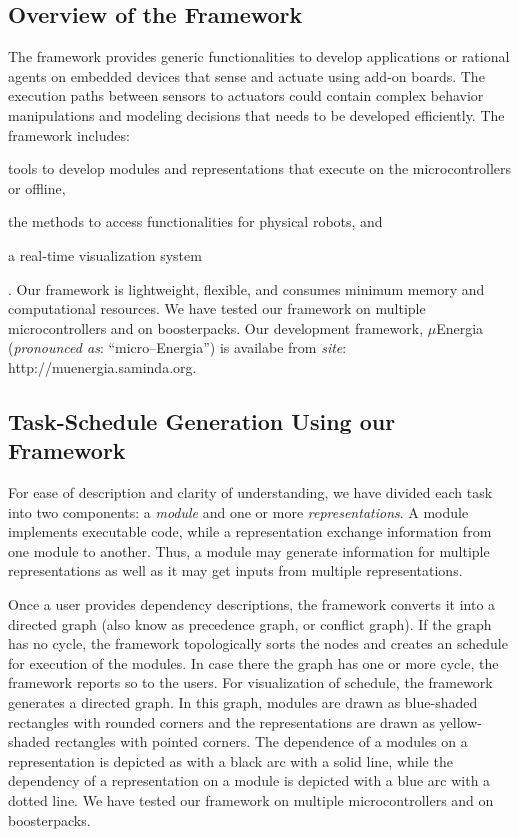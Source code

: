 \documentclass{IEEEtran}
\begin{document}
\subsection{Overview of the Framework}
\label{sec:OverviewOfTheFramework}

\par
The framework provides generic functionalities to develop applications or rational agents 
on embedded devices that sense and actuate using add-on boards. The execution paths between sensors 
to actuators could contain complex behavior manipulations and modeling decisions that needs to be 
developed efficiently.
The framework 
includes: \begin{inparaenum}[($i$)] \item tools to develop modules and representations that execute on 
the microcontrollers or offline, \item the methods to access functionalities for physical 
robots, 
and \item a real-time visualization system\end{inparaenum}. Our framework is lightweight, flexible, 
and consumes minimum memory and computational resources. We have tested our framework on multiple 
microcontrollers and on boosterpacks. 
Our development framework, $\mu$Energia (\textit{pronounced as}: ``micro--Energia'') is availabe from
\textit{site}:
{http://muenergia.saminda.org}.

\subsection{Task-Schedule Generation Using our Framework}
\label{FrameWorkDescription}


 For ease of description and clarity of understanding, we have divided each task into two components: a {\em module} and one or more {\em representations}. A module implements executable code, while a representation exchange information from one module to another. Thus, a module may generate information for multiple representations as well as it may get inputs from multiple representations. 
\par
Once a user provides dependency descriptions, the framework converts it  into a directed graph (also know as precedence graph, or conflict graph).  If the graph has no cycle, the framework topologically sorts the nodes and creates an schedule for execution of the modules. In case there the graph has one or more cycle, the framework reports so to the users.
For visualization of schedule, the framework  generates a directed graph. In this graph, modules are drawn as blue-shaded rectangles with rounded corners and the representations are drawn as yellow-shaded rectangles with pointed corners. The dependence of a modules on a representation is depicted as with a black arc with a solid line, while the dependency of a representation on a module is depicted with a blue arc with a dotted line. We have tested our framework on multiple 
microcontrollers and on boosterpacks.
\end{document}
